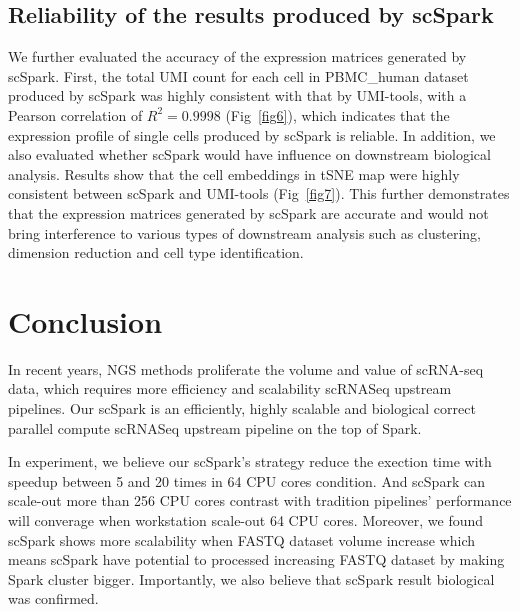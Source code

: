 \documentclass[conference]{IEEEtran}
\begin{document}
\subsection{Reliability of the results produced by scSpark} 
We further evaluated the accuracy of the expression matrices generated by scSpark.
First, the total UMI count for each cell in PBMC\_human dataset produced by scSpark was highly consistent with that by UMI-tools, with a Pearson correlation of $R^{2} = 0.9998$ (Fig~\ref{fig6}), which indicates that the expression profile of single cells produced by scSpark is reliable.
In addition, we also evaluated whether scSpark would have influence on downstream biological analysis.
Results show that the cell embeddings in tSNE map were highly consistent between scSpark and UMI-tools (Fig~\ref{fig7}).
This further demonstrates that the expression matrices generated by scSpark are accurate and would not bring interference to various types of downstream analysis such as clustering, dimension reduction and cell type identification.

\section{Conclusion}

In recent years, NGS methods proliferate the volume and value of scRNA-seq data, which requires more efficiency and scalability scRNASeq upstream pipelines.
Our scSpark is an efficiently, highly scalable and biological correct parallel compute scRNASeq upstream pipeline on the top of Spark.

In experiment, we believe our scSpark's strategy reduce the exection time with speedup between 5 and 20 times in 64 CPU cores condition.
And scSpark can scale-out more than 256 CPU cores contrast with tradition pipelines' performance will converage when workstation scale-out 64 CPU cores.
Moreover, we found scSpark shows more scalability when FASTQ dataset volume increase which means scSpark have potential to processed increasing FASTQ dataset by making Spark cluster bigger.
Importantly, we also believe that scSpark result biological was confirmed.



\end{document}
